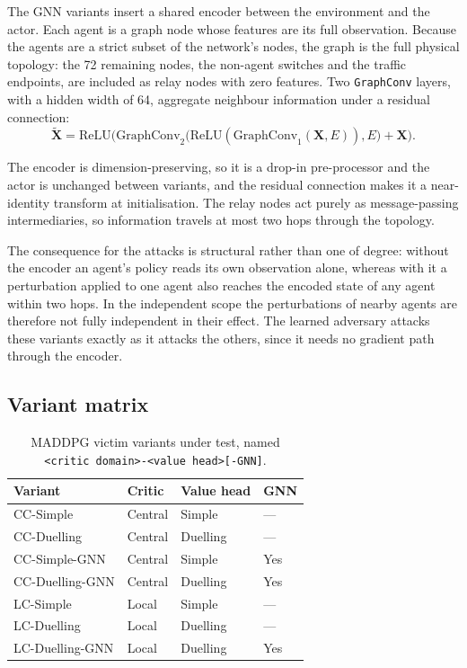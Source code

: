 The GNN variants insert a shared encoder between the environment and the actor.
Each agent is a graph node whose features are its full observation. Because the agents
are a strict subset of the network's nodes, the graph is the full physical topology: the
72 remaining nodes, the non-agent switches and the traffic endpoints, are included as
relay nodes with zero features. Two \texttt{GraphConv} layers, with a hidden width of 64,
aggregate neighbour information under a residual connection:
\begin{equation}
  \tilde{\mathbf{X}} = \mathrm{ReLU}\Big(
     \mathrm{GraphConv}_2\big(\mathrm{ReLU}(\mathrm{GraphConv}_1(\mathbf{X}, E)), E\big)
     + \mathbf{X} \Big).
  \label{eq:arch_gnn}
\end{equation}

\noindent The encoder is dimension-preserving, so it is a drop-in pre-processor and
the actor is unchanged between variants, and the residual connection makes it a
near-identity transform at initialisation. The relay nodes act purely as
message-passing intermediaries, so information travels at most two hops through the
topology.

The consequence for the attacks is structural rather than one of degree: without the
encoder an agent's policy reads its own observation alone, whereas with it a
perturbation applied to one agent also reaches the encoded state of any agent within two
hops. In the independent scope the perturbations of nearby agents are therefore not
fully independent in their effect. The learned adversary attacks these variants exactly
as it attacks the others, since it needs no gradient path through the encoder.

\subsection{Variant matrix}
\label{subsec:variant_matrix}

\begin{table}[htbp]
  \centering
  \caption[MADDPG victim variants under test]{MADDPG victim variants under test, named
           \texttt{<critic domain>-<value head>[-GNN]}.}
  \label{tab:variant_matrix}
  \begin{tabular}{llll}
    \hline
    \textbf{Variant} & \textbf{Critic} & \textbf{Value head} & \textbf{GNN} \\
    \hline
    CC-Simple        & Central & Simple   & --- \\
    CC-Duelling      & Central & Duelling & --- \\
    CC-Simple-GNN    & Central & Simple   & Yes \\
    CC-Duelling-GNN  & Central & Duelling & Yes \\
    LC-Simple        & Local   & Simple   & --- \\
    LC-Duelling      & Local   & Duelling & --- \\
    LC-Duelling-GNN  & Local   & Duelling & Yes \\
    \hline
  \end{tabular}
\end{table}

